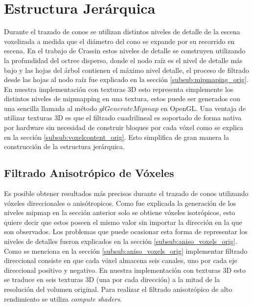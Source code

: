 \section{Estructura Jerárquica} %
\label{sec:estructura_jerarquica}
Durante el trazado de conos se utilizan distintos niveles de detalle de la escena voxelizada a medida que el diámetro del cono se expande por su recorrido en escena. En el trabajo de Crassin estos niveles de detalle se construyen utilizando la profundidad del octree disperso, donde el nodo raíz es el nivel de detalle más bajo y las hojas del árbol contienen el máximo nivel detalle, el proceso de filtrado desde las hojas al nodo raíz fue explicado en la sección \ref{subsub:mipmaping_orig}. En nuestra implementación con texturas 3D esto representa simplemente los distintos niveles de mipmapping en una textura, estos puede ser generados con una sencilla llamada al método $glGenerateMipmap$ en OpenGL. Una ventaja de utilizar texturas 3D es que el filtrado cuadrilineal es soportado de forma nativa por hardware sin necesidad de construir bloques por cada vóxel como se explica en la sección \ref{subsub:voxelcontent_orig}. Esto simplifica de gran manera la construcción de la estructura jerárquica.

\subsection{Filtrado Anisotrópico de Vóxeles} %
\label{sub:mipmapping_direccioanl}
Es posible obtener resultados más precisos durante el trazado de conos utilizando vóxeles direccionales o anisótropicos. Como fue explicada la generación de los niveles mipmap en la sección anterior solo se obtiene vóxeles isotrópicos, esto quiere decir que estos poseen el mismo valor sin importar la dirección en la que son observados. Los problemas que puede ocasionar esta forma de representar los niveles de detalles fueron explicados en la sección \ref{subsub:aniso_voxels_orig}.
Como se menciona en la sección \ref{subsub:aniso_voxels_orig} implementar filtrado direccional consiste en que cada vóxel almacena seis canales, uno por cada eje direccional positivo y negativo. En nuestra implementación con texturas 3D esto se traduce en seis texturas 3D (una por cada dirección) a la mitad de la resolución del volumen original. Para realizar el filtrado anisotrópico de alto rendimiento se utiliza \emph{compute shaders}.
